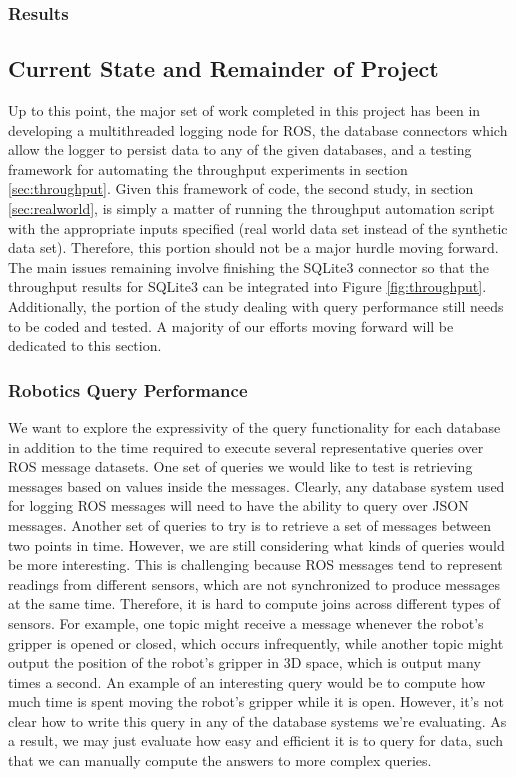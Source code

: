 \documentclass[nocopyrightspace]{acm_proc_article-sp}
\begin{document}
\subsubsection{Results}


\subsection{Current State and Remainder of Project}
Up to this point, the major set of work completed in this project has been in developing a multithreaded logging node for ROS, the database connectors which allow the logger to persist data to any of the given databases, and a testing framework for automating the throughput experiments in section \ref{sec:throughput}. Given this framework of code, the second study, in section \ref{sec:realworld}, is simply a matter of running the throughput automation script with the appropriate inputs specified (real world data set instead of the synthetic data set). Therefore, this portion should not be a major hurdle moving forward. The main issues remaining involve finishing the SQLite3 connector so that the throughput results for SQLite3 can be integrated into Figure \ref{fig:throughput}. Additionally, the portion of the study dealing with query performance still needs to be coded and tested. A majority of our efforts moving forward will be dedicated to this section.

\subsubsection{Robotics Query Performance}
We want to explore the expressivity of the query functionality for each database in addition to the time required to execute several representative queries over ROS message datasets. One set of queries we would like to test is retrieving messages based on values inside the messages. Clearly, any database system used for logging ROS messages will need to have the ability to query over JSON messages. Another set of queries to try is to retrieve a set of messages between two points in time. However, we are still considering what kinds of queries would be more interesting. This is challenging because ROS messages tend to represent readings from different sensors, which are not synchronized to produce messages at the same time. Therefore, it is hard to compute joins across different types of sensors. For example, one topic might receive a message whenever the robot's gripper is opened or closed, which occurs infrequently, while another topic might output the position of the robot's gripper in 3D space, which is output many times a second. An example of an interesting query would be to compute how much time is spent moving the robot's gripper while it is open. However, it's not clear how to write this query in any of the database systems we're evaluating. As a result, we may just evaluate how easy and efficient it is to query for data, such that we can manually compute the answers to more complex queries.
\end{document}

